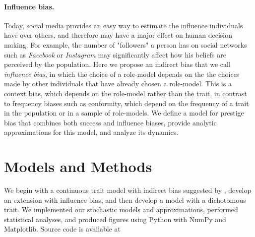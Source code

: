 \documentclass[11pt]{article}
\begin{document}
\paragraph{Influence bias.}
Today, social media provides an easy way to estimate the influence individuals have over others, and therefore may have a major effect on human decision making. For example, the number of "followers" a person has on social networks such as \textit{Facebook} or \textit{Instagram} may significantly affect how his beliefs are perceived by the population. %
Here we propose an indirect bias that we call \textit{influence bias}, in which the choice of a role-model depends on the the choices made by other individuals that have already chosen a role-model. 
This is a context bias, %
 which depends on the role-model rather than the trait, in contrast to frequency biases such as conformity, which depend on the frequency of a trait in the population or in a sample of role-models. 
We define a model for prestige bias that combines both success and influence biases, provide analytic approximations for this model, and analyze its dynamics.
 
\section{Models and Methods}


We begin with a continuous trait model with indirect bias suggested by \citet{evolutionBook}, develop an extension with influence bias, and then develop a model with a dichotomous trait.
We implemented our stochastic models and approximations, performed statistical analyses, and produced figures using Python with NumPy and Matplotlib. %
Source code is available at %
\end{document}
